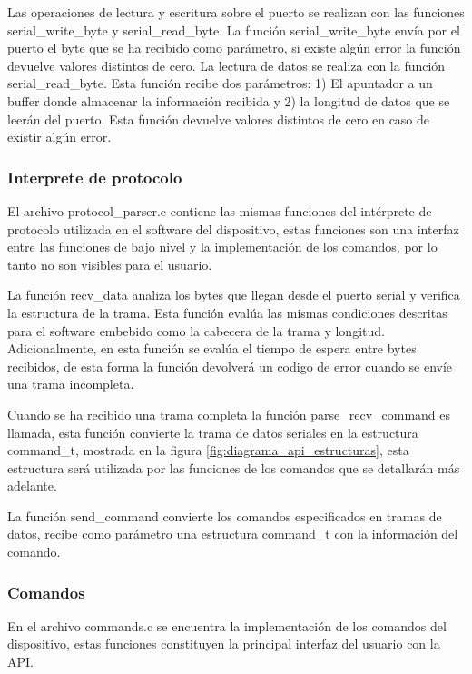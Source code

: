 Las operaciones de lectura y escritura sobre el puerto se realizan con las funciones serial\_write\_byte y serial\_read\_byte. La función serial\_write\_byte envía por el puerto el byte que se ha recibido como parámetro, si existe algún error la función devuelve valores distintos de cero. La lectura de datos se realiza con la función serial\_read\_byte. Esta función recibe dos parámetros: 1) El apuntador a un buffer donde almacenar la información recibida y 2) la longitud de datos que se leerán del puerto. Esta función devuelve valores distintos de cero en caso de existir algún error. 

\subsubsection{Interprete de protocolo}

El archivo protocol\_parser.c contiene las mismas funciones del intérprete de protocolo utilizada en el software del dispositivo, estas funciones son una interfaz entre las funciones de bajo nivel y la implementación de los comandos, por lo tanto no son visibles para el usuario. 

La función recv\_data analiza los bytes que llegan desde el puerto serial y verifica la estructura de la trama. Esta función evalúa las mismas condiciones descritas para el software embebido como la cabecera de la trama y longitud. Adicionalmente, en esta función se evalúa el tiempo de espera entre bytes recibidos, de esta forma la función devolverá un codigo de error cuando se envíe una trama incompleta.

Cuando se ha recibido una trama completa la función parse\_recv\_command es llamada, esta función convierte la trama de datos seriales en la estructura command\_t, mostrada en la figura \ref{fig:diagrama_api_estructuras}, esta estructura será utilizada por las funciones de los comandos que se detallarán más adelante.

La función send\_command convierte los comandos especificados en tramas de datos, recibe como parámetro una estructura command\_t con la información del comando. 

\subsubsection{Comandos}

En el archivo commands.c se encuentra la implementación de los comandos del dispositivo, estas funciones constituyen la principal interfaz del usuario con la API. 

